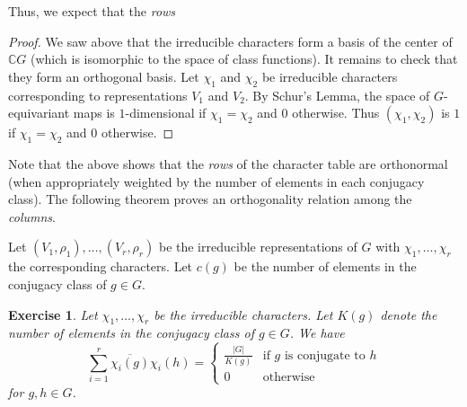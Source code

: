 \documentclass[12pt]{article}
\theoremstyle{plain}
\newtheorem{exercise}[theorem]{Exercise}
\theoremstyle{definition}
\theoremstyle{remark}
\numberwithin{equation}{section}
\begin{document}
Thus, we expect that the \emph{rows}

\newpage


\begin{proof}
We saw above that the irreducible characters form a basis
of the center of $\mathbb{C} G$ (which is isomorphic to the space of class functions).
It remains to check that they form an orthogonal basis.
Let $\chi_1$ and $\chi_2$ be irreducible characters
corresponding to representations $V_1$ and $V_2$.
By Schur's Lemma, the space of $G$-equivariant maps is
$1$-dimensional if $\chi_1=\chi_2$ and $0$ otherwise.
Thus $(\chi_1,\chi_2)$ is $1$ if $\chi_1=\chi_2$ and $0$ otherwise.
\end{proof}

Note that the above shows that the \emph{rows} of the character table are
orthonormal (when appropriately weighted by the number of elements in
each conjugacy class).  The following theorem proves an orthogonality
relation among the \emph{columns}.

Let $(V_1, \rho_1), \ldots, (V_r, \rho_r)$ be the irreducible
representations of $G$ with $\chi_1, \ldots, \chi_r$ the corresponding
characters.  Let $c(g)$ be the number of elements in the conjugacy class
of $g \in G$.

\begin{exercise}
Let $\chi_1,\ldots,\chi_r$ be the irreducible characters.
Let $K(g)$ denote the number of elements in the conjugacy class of $g \in
G$.
We have
\[
\sum_{i=1}^r \overline{\chi_i(g)} \chi_i(h) =
\begin{cases}
\frac{|G|}{K(g)} & \textrm{if $g$ is conjugate to $h$}\\
0 & \textrm{otherwise}
\end{cases}
\]
for $g, h \in G$.
\end{exercise}




\end{document}
